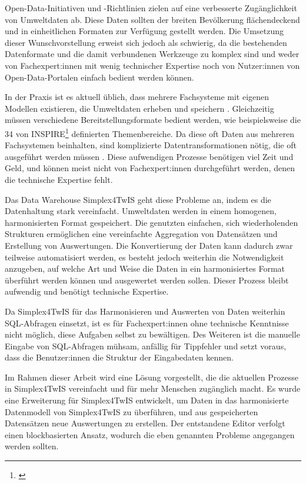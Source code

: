 Open-Data-Initiativen und -Richtlinien zielen auf eine verbesserte Zugänglichkeit von Umweltdaten ab. Diese Daten sollten der breiten Bevölkerung flächendeckend und in einheitlichen Formaten zur Verfügung gestellt werden. Die Umsetzung dieser Wunschvorstellung erweist sich jedoch als schwierig, da die bestehenden Datenformate und die damit verbundenen Werkzeuge zu komplex sind und weder von Fachexpert:innen mit wenig technischer Expertise noch von Nutzer:innen von Open-Data-Portalen einfach bedient werden können.

In der Praxis ist es aktuell üblich, dass mehrere Fachsysteme mit eigenen Modellen existieren, die Umweltdaten erheben und speichern \parencite{rudolfUnsereDaten2022}. Gleichzeitig müssen verschiedene Bereitstellungsformate bedient werden, wie beispielsweise die 34 von INSPIRE\footnote{\textcite{inspireRichtlinie20072007}} definierten Themenbereiche. Da diese oft Daten aus mehreren Fachsystemen beinhalten, sind komplizierte Datentransformationen nötig, die oft ausgeführt werden müssen \parencite{grossmannEnvVisioUniverselle2021}. Diese aufwendigen Prozesse benötigen viel Zeit und Geld, und können meist nicht von Fachexpert:innen durchgeführt werden, denen die technische Expertise fehlt.

\pskip
Das Data Warehouse Simplex4TwIS geht diese Probleme an, indem es die Datenhaltung stark vereinfacht. Umweltdaten werden in einem homogenen, harmonisierten Format gespeichert. Die genutzten einfachen, sich wiederholenden Strukturen ermöglichen eine vereinfachte Aggregation von Datensätzen und Erstellung von Auswertungen. Die Konvertierung der Daten kann dadurch zwar teilweise automatisiert werden, es besteht jedoch weiterhin die Notwendigkeit anzugeben, auf welche Art und Weise die Daten in ein harmonisiertes Format überführt werden können und ausgewertet werden sollen. Dieser Prozess bleibt aufwendig und benötigt technische Expertise.

Da Simplex4TwIS für das Harmonisieren und Auswerten von Daten weiterhin \acs{SQL}-Abfragen einsetzt, ist es für Fachexpert:innen ohne technische Kenntnisse nicht möglich, diese Aufgaben selbst zu bewältigen. Des Weiteren ist die manuelle Eingabe von \acs{SQL}-Abfragen mühsam, anfällig für Tippfehler und setzt voraus, dass die Benutzer:innen die Struktur der Eingabedaten kennen.

\pskip
Im Rahmen dieser Arbeit wird eine Lösung vorgestellt, die die aktuellen Prozesse in Simplex4TwIS vereinfacht und für mehr Menschen zugänglich macht. Es wurde eine Erweiterung für Simplex4TwIS entwickelt, um Daten in das harmonisierte Datenmodell von Simplex4TwIS zu überführen, und aus gespeicherten Datensätzen neue Auswertungen zu erstellen. Der entstandene Editor verfolgt einen blockbasierten Ansatz, wodurch die eben genannten Probleme angegangen werden sollten.

